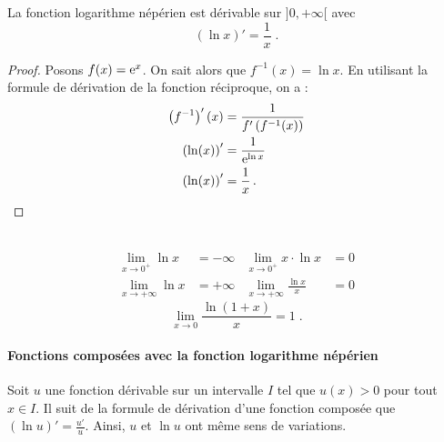       \begin{thm}
            La fonction logarithme n\'ep\'erien est d\'erivable sur $]0,+\infty[$ avec
                  \begin{equation*}
                        \left( \ln x \right)' = \frac{1}{x}      \;.
                  \end{equation*}
            \begin{proof}
                  Posons $f(x) = \mathrm{e}^{x}$. On sait alors que $f^{-1} (x) = \ln x$.
                  En utilisant la formule de d\'erivation de la fonction r\'eciproque, on a :
                        \begin{align*}
                              \left(f^{-1}\right)' (x)  & = \frac{1}{f' \left( f^{-1} (x) \right) }      \\
                              \left(\ln (x) \right)'    & = \frac{1}{\mathrm{e}^{\ln x}}                       \\
                              \left(\ln (x) \right)'    & = \frac{1}{x}                                  \,.
                        \end{align*}
            \end{proof}
      \end{thm}
      \begin{thm}~\\
                  \begin{align*}
                        \lim_{x\rightarrow 0^+} \ln x                & = -\infty            &
                        \lim_{x\rightarrow 0^+} x\cdot\ln x          & = 0                  \\
                        \lim_{x\rightarrow +\infty} \ln x            & = +\infty            &
                        \lim_{x\rightarrow +\infty} \frac{\ln x}{x}  & = 0                  
                  \end{align*}
                  \[
                        \lim_{x\rightarrow 0} \frac{\ln (1 + x)}{x} = 1      \;.
                  \]
      \end{thm}
      \paragraph{Fonctions compos\'ees avec la fonction logarithme n\'ep\'erien}
            Soit $u$ une fonction d\'erivable sur un intervalle $I$ tel que $u(x)>0$ pour tout $x\in I$.
            Il suit de la formule de d\'erivation d'une fonction compos\'ee que 
            $\left( \ln {u} \right)' = \frac{u'}{u}$.
            Ainsi, $u$ et $\ln{u}$ ont m\^eme sens de variations.
            
